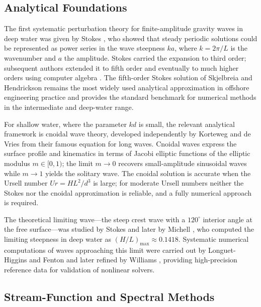 \documentclass[journal,10pt,twocolumn]{IEEEtran}
\begin{document}
\subsection{Analytical Foundations}

The first systematic perturbation theory for finite-amplitude gravity
waves in deep water was given by Stokes \cite{Stokes1847}, who showed
that steady periodic solutions could be represented as power series in
the wave steepness $ka$, where $k = 2\pi/L$ is the wavenumber and $a$
the amplitude.
Stokes carried the expansion to third order; subsequent authors
extended it to fifth order \cite{Skjelbreia1960} and eventually to
much higher orders using computer algebra
\cite{Schwartz1974,Longuet-Higgins1975}.
The fifth-order Stokes solution of Skjelbreia and Hendrickson
\cite{Skjelbreia1960} remains the most widely used analytical
approximation in offshore engineering practice and provides the
standard benchmark for numerical methods in the intermediate and
deep-water range.

For shallow water, where the parameter $kd$ is small, the relevant
analytical framework is cnoidal wave theory, developed independently
by Korteweg and de Vries \cite{KortewegDeVries1895} from their
famous equation for long waves.
Cnoidal waves express the surface profile and kinematics in terms of
Jacobi elliptic functions of the elliptic modulus $m \in [0,1)$;
the limit $m \to 0$ recovers small-amplitude sinusoidal waves while
$m \to 1$ yields the solitary wave.
The cnoidal solution is accurate when the Ursell number
$Ur = HL^2/d^3$ is large; for moderate Ursell numbers neither
the Stokes nor the cnoidal approximation is reliable, and a fully
numerical approach is required.

The theoretical limiting wave---the steep crest wave with a $120^\circ$
interior angle at the free surface---was studied by Stokes and later
by Michell \cite{Michell1893}, who computed the limiting steepness in
deep water as $(H/L)_{\max} \approx 0.1418$.
Systematic numerical computations of waves approaching this limit were
carried out by Longuet-Higgins and Fenton \cite{LonguetHiggins1974}
and later refined by Williams \cite{Williams1981}, providing
high-precision reference data for validation of nonlinear solvers.

\subsection{Stream-Function and Spectral Methods}
\end{document}
